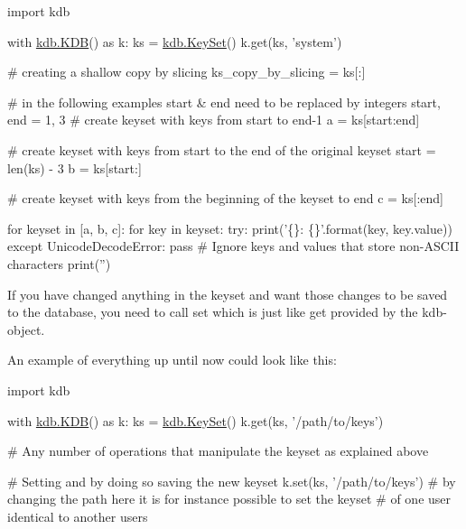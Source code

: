 \begin{DoxyCode}
\textcolor{keyword}{import} kdb

with \hyperlink{classkdb_1_1KDB}{kdb.KDB}() \textcolor{keyword}{as} k:
    ks = \hyperlink{classkdb_1_1KeySet}{kdb.KeySet}()
    k.get(ks, \textcolor{stringliteral}{'system'})

    \textcolor{comment}{# creating a shallow copy by slicing}
    ks\_copy\_by\_slicing = ks[:]

    \textcolor{comment}{# in the following examples start & end need to be replaced by integers}
    start, end = 1, 3
    \textcolor{comment}{# create keyset with keys from start to end-1}
    a = ks[start:end]

    \textcolor{comment}{# create keyset with keys from start to the end of the original keyset}
    start = len(ks) - 3
    b = ks[start:]

    \textcolor{comment}{# create keyset with keys from the beginning of the keyset to end}
    c = ks[:end]

    \textcolor{keywordflow}{for} keyset \textcolor{keywordflow}{in} [a, b, c]:
        \textcolor{keywordflow}{for} key \textcolor{keywordflow}{in} keyset:
            \textcolor{keywordflow}{try}:
                print(\textcolor{stringliteral}{'\{\}: \{\}'}.format(key, key.value))
            \textcolor{keywordflow}{except} UnicodeDecodeError:
                \textcolor{keywordflow}{pass}  \textcolor{comment}{# Ignore keys and values that store non-ASCII characters}
        print(\textcolor{stringliteral}{''})
\end{DoxyCode}


If you have changed anything in the keyset and want those changes to be saved to the database, you need to call {\ttfamily set} which is just like {\ttfamily get} provided by the kdb-\/object.

An example of everything up until now could look like this\+:


\begin{DoxyCode}
\textcolor{keyword}{import} kdb

with \hyperlink{classkdb_1_1KDB}{kdb.KDB}() \textcolor{keyword}{as} k:
    ks = \hyperlink{classkdb_1_1KeySet}{kdb.KeySet}()
    k.get(ks, \textcolor{stringliteral}{'/path/to/keys'})

    \textcolor{comment}{# Any number of operations that manipulate the keyset as explained above}

    \textcolor{comment}{# Setting and by doing so saving the new keyset}
    k.set(ks, \textcolor{stringliteral}{'/path/to/keys'})
    \textcolor{comment}{# by changing the path here it is for instance possible to set the keyset}
    \textcolor{comment}{# of one user identical to another users}
\end{DoxyCode}


